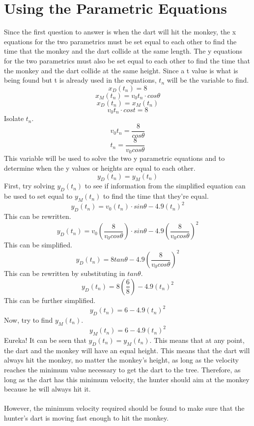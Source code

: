 \documentclass[12pt]{article}
\begin{document}
\section{Using the Parametric Equations}
Since the first question to answer is when the dart will hit the monkey, the x equations for the two parametrics must be set equal to each other to find the time that the monkey and the dart collide at the same length. The y equations for the two parametrics must also be set equal to each other to find the time that the monkey and the dart collide at the same height. Since a t value is what is being found but t is already used in the equations, $t_n$ will be the variable to find.
$$x_D(t_n)=8$$
$$x_M(t_n)=v_{0}t_n\cdot cos\theta$$
$$x_D(t_n)=x_M(t_n)$$
$$v_{0}t_n\cdot cost=8$$
Isolate $t_n$.
$$v_0t_n=\frac{8}{cos\theta}$$
$$t_n=\frac{8}{v_{0}cos\theta}$$
This variable will be used to solve the two y parametric equations and to determine when the y values or heights are equal to each other.
$$y_{D}(t_n)=y_M(t_n)$$
First, try solving $y_D(t_n)$ to see if information from the simplified equation can be used to set equal to $y_M(t_n)$ to find the time that they're equal.
$$y_D(t_n)=v_{0}(t_n)\cdot sin\theta-4.9(t_n)^2$$
This can be rewritten.
$$y_D(t_n)=v_{0}(\frac{8}{v_{0}cos\theta})\cdot sin\theta-4.9(\frac{8}{v_{0}cos\theta})^2$$
This can be simplified.
$$y_D(t_n)=8tan\theta-4.9(\frac{8}{v_{0}cos\theta})^2$$
This can be rewritten by substituting in $tan\theta$.
$$y_D(t_n)=8(\frac{6}{8})-4.9(t_n)^2$$
This can be further simplified.
$$y_D(t_n)=6-4.9(t_n)^2$$
Now, try to find $y_M(t_n)$.
$$y_M(t_n)=6-4.9(t_n)^2$$
Eureka! It can be seen that $y_D(t_n)=y_M(t_n)$. This means that at any point, the dart and the monkey will have an equal height. This means that the dart will always hit the monkey, no matter the monkey's height, as long as the velocity reaches the minimum value necessary to get the dart to the tree. Therefore, as long as the dart has this minimum velocity, the hunter should aim at the monkey because he will always hit it.\\\\
However, the minimum velocity required should be found to make sure that the hunter's dart is moving fast enough to hit the monkey.
\end{document}
